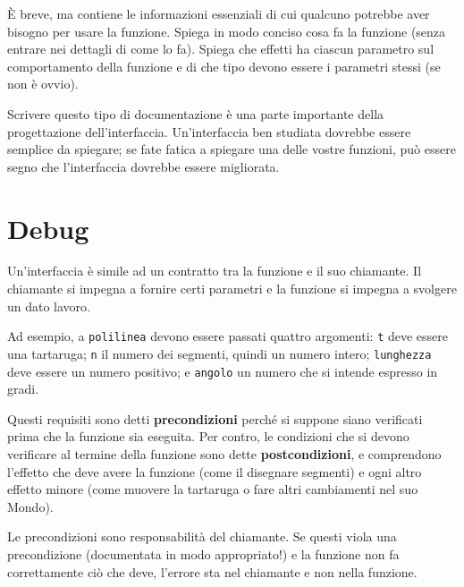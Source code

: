 \documentclass[10pt]{book}
\begin{document}
È breve, ma contiene le informazioni essenziali di cui qualcuno potrebbe aver bisogno per usare la funzione. Spiega in modo conciso cosa fa la funzione (senza entrare nei dettagli di come lo fa). Spiega che effetti ha ciascun parametro sul comportamento della funzione e di che tipo devono essere i parametri stessi (se non è ovvio).

Scrivere questo tipo di documentazione è una parte importante della progettazione dell'interfaccia. Un'interfaccia ben studiata dovrebbe essere semplice da spiegare; se fate fatica a spiegare una delle vostre funzioni, può essere segno che l'interfaccia dovrebbe essere migliorata.


\section{Debug}

Un'interfaccia è simile ad un contratto tra la funzione e il suo chiamante. Il chiamante si impegna a fornire certi parametri e la funzione si impegna a svolgere un dato lavoro.

Ad esempio, a {\tt polilinea} devono essere passati quattro argomenti: {\tt t} deve essere una tartaruga; {\tt n} il numero dei segmenti, quindi un numero intero; {\tt lunghezza} deve essere un numero positivo; e {\tt angolo} un numero che si intende espresso in gradi.

Questi requisiti sono detti {\bf precondizioni} perché si suppone siano verificati prima che la funzione sia eseguita. Per contro, le condizioni che si devono verificare al termine della funzione sono dette {\bf postcondizioni},  e comprendono l'effetto che deve avere la funzione (come il disegnare segmenti) e ogni altro effetto minore (come muovere la tartaruga o fare altri cambiamenti nel suo Mondo).

Le precondizioni sono responsabilità del chiamante. Se questi viola una precondizione (documentata in modo appropriato!) e la funzione non fa correttamente ciò che deve, l'errore sta nel chiamante e non nella funzione.

\end{document}
